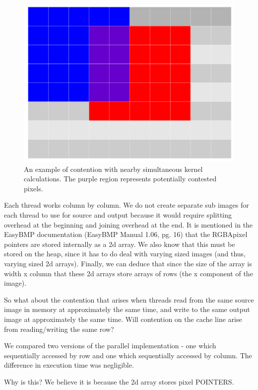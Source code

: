 \documentclass[paper=a4, fontsize=11pt]{scrartcl} %
\numberwithin{equation}{section} %
\numberwithin{figure}{section} %
\numberwithin{table}{section} %
\begin{document}
\begin{figure}[H]
	\centering
	\includegraphics[scale=0.2]{"Kernels"}
	\caption{An example of contention with nearby simultaneous kernel calculations. The purple region represents potentially contested pixels.}
        \label{kernels}
\end{figure}
  
Each thread works column by column. We do not create separate sub images for each thread to use for source and output because it would require splitting overhead at the beginning and joining overhead at the end. It is mentioned in the EasyBMP documentation (EasyBMP Manual 1.06, pg. 16) that the RGBApixel pointers are stored internally as a 2d array. We also know that this must be stored on the heap, since it has to do deal with varying sized images (and thus, varying sized 2d arrays). Finally, we can deduce that since the size of the array is width x column that these 2d arrays store arrays of rows (the x component of the image).


So what about the contention that arises when threads read from the same source image in memory at approximately the same time, and write to the same output image at approximately the same time. Will contention on the cache line arise from reading/writing the same row?


We compared two versions of the parallel implementation - one which sequentially accessed by row and one which sequentially accessed by column. The difference in execution time was negligible.


Why is this? We believe it is because the 2d array stores pixel POINTERS.
\end{document}
